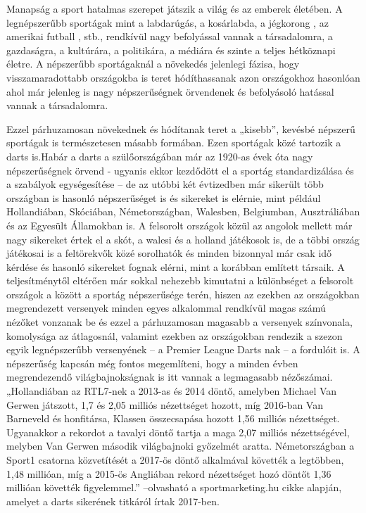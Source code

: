 
Manapság a sport hatalmas szerepet játszik a világ és az emberek életében. A legnépszerűbb 
sportágak mint a labdarúgás, a kosárlabda, a jégkorong , az amerikai futball , stb., rendkívül 
nagy befolyással vannak a társadalomra, a gazdaságra, a kultúrára, a politikára, a médiára és 
szinte a teljes hétköznapi életre. A népszerűbb sportágaknál a növekedés jelenlegi fázisa, 
hogy visszamaradottabb országokba is teret hódíthassanak azon országokhoz hasonlóan ahol 
már jelenleg is nagy népszerűségnek örvendenek és befolyásoló hatással vannak a 
társadalomra.

Ezzel párhuzamosan növekednek és hódítanak teret a „kisebb”, kevésbé népszerű sportágak 
is természetesen másabb formában. Ezen sportágak közé tartozik a darts is.Habár a darts a 
szülőországában már az 1920-as évek óta nagy népszerűségnek örvend - ugyanis ekkor 
kezdődött el a sportág standardizálása és a szabályok egységesítése – de az utóbbi két 
évtizedben már sikerült több országban is hasonló népszerűséget is és sikereket is elérnie, 
mint például Hollandiában, Skóciában, Németországban, Walesben, Belgiumban, 
Ausztráliában és az Egyesült Államokban is. A felsorolt országok közül az angolok mellett 
már nagy sikereket értek el a skót, a walesi és a holland játékosok is, de a többi ország 
játékosai is a feltörekvők közé sorolhatók és minden bizonnyal már csak idő kérdése és 
hasonló sikereket fognak elérni, mint a korábban említett társaik. A teljesítménytől eltérően 
már sokkal nehezebb kimutatni a különbséget a felsorolt országok a között a sportág 
népszerűsége terén, hiszen az ezekben az országokban megrendezett versenyek minden 
egyes alkalommal rendkívül magas számú nézőket vonzanak be és ezzel a párhuzamosan 
magasabb a versenyek színvonala, komolysága az átlagosnál, valamint ezekben az 
országokban rendezik a szezon egyik legnépszerűbb versenyének – a Premier League Darts
nak – a fordulóit is. A népszerűség kapcsán még fontos megemlíteni, hogy a minden évben 
megrendezendő világbajnokságnak is itt vannak a legmagasabb nézőszámai.  
„Hollandiában az RTL7-nek a 2013-as és 2014 döntő, amelyben Michael Van Gerwen 
játszott, 1,7 és 2,05 milliós nézettséget hozott, míg 2016-ban Van Barneveld és honfitársa, 
Klassen összecsapása hozott 1,56 milliós nézettséget. Ugyanakkor a rekordot a tavalyi döntő 
tartja a maga 2,07 milliós nézettségével, melyben Van Gerwen második világbajnoki 
győzelmét aratta. Németországban a Sport1 csatorna közvetítését a 2017-ös döntő 
alkalmával követték a legtöbben, 1,48 millióan, míg a 2015-ös Angliában rekord nézettséget 
hozó döntőt 1,36 millióan követték figyelemmel.” –olvasható a sportmarketing.hu cikke 
alapján, amelyet a darts sikerének titkáról írtak 2017-ben.


